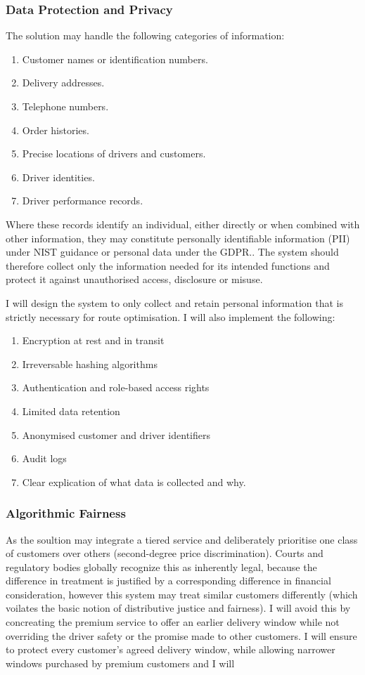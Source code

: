 \documentclass[11pt]{article}
\begin{document}
\subsubsection{Data Protection and Privacy}
The solution may handle the following categories of information:
\begin{enumerate}
    \item Customer names or identification numbers.
    \item Delivery addresses.
    \item Telephone numbers.
    \item Order histories.
    \item Precise locations of drivers and customers.
    \item Driver identities.
    \item Driver performance records.
\end{enumerate} 
Where these records identify an individual, either directly or when combined with other information, they may constitute personally identifiable information (PII) under NIST guidance or personal data under the GDPR.\cite{nist_sp_800_122,eu_gdpr_2016}. The system should therefore collect only the information needed for its intended functions and protect it against unauthorised access, disclosure or misuse.

I will design the system to only collect and retain personal information that is strictly necessary for route optimisation. I will also implement the following: 

\begin{enumerate}
    \item Encryption at rest and in transit
    \item Irreversable hashing algorithms 
    \item Authentication and role-based access rights
    \item Limited data retention
    \item Anonymised customer and driver identifiers
    \item Audit logs
    \item Clear explication of what data is collected and why.
\end{enumerate} 

\subsubsection{Algorithmic Fairness}
As the soultion may integrate a tiered service and deliberately prioritise one class of customers over others (second-degree price discrimination). Courts and regulatory bodies globally recognize this as inherently legal, because the difference in treatment is justified by a corresponding difference in financial consideration, however this system may treat similar customers differently (which voilates the basic notion of distributive justice and fairness). I will avoid this by concreating the premium service to offer an earlier delivery window while not overriding the driver safety or the promise made to other customers. I will ensure to protect every customer's agreed delivery window, while allowing narrower windows purchased by premium customers and I will 
\end{document}

